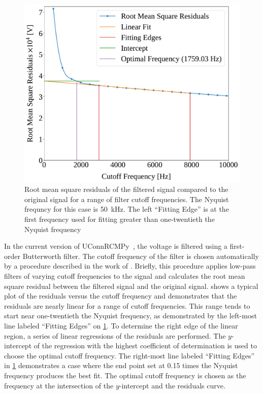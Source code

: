 \documentclass[12pt]{../ussci}
\begin{document}
\begin{figure}[htbp]
\begin{minipage}[t]{0.48\textwidth}
        \includegraphics[width=\linewidth]{figures/residuals.pdf}
        \caption{Root mean square residuals of the filtered signal compared to
        the original signal for a range of filter cutoff frequencies. The
        Nyquist frequncy for this case is \SI{50}{\kHz}. The left ``Fitting
        Edge'' is at the first frequency used for fitting greater than
        one-twentieth the Nyquist frequency}
        \label{fig:residuals}
    \end{minipage}
\end{figure}

In the current version of UConnRCMPy~\autocite{uconnrcmpy}, the voltage is
filtered using a first-order Butterworth filter. The cutoff frequency of the
filter is chosen automatically by a procedure described in the work of
\textcite{Yu1999,Duarte2014}. Briefly, this procedure applies low-pass filters
of varying cutoff frequencies to the signal and calculates the root mean square
residual between the filtered signal and the original signal.
 shows a typical plot of the residuals versus the cutoff
frequency and demonstrates that the residuals are nearly linear for a range of
cutoff frequencies. This range tends to start near one-twentieth the Nyquist
frequency, as demonstrated by the left-most line labeled ``Fitting Edges'' on
\cref{fig:residuals}. To determine the right edge of the linear region, a series
of linear regressions of the residuals are performed. The $y$-intercept of the
regression with the highest coefficient of determination is used to choose the
optimal cutoff frequency. The right-most line labeled ``Fitting Edges'' in
\cref{fig:residuals} demonstrates a case where the end point set at \num{0.15}
times the Nyquist frequency produces the best fit. The optimal cutoff frequency
is chosen as the frequency at the intersection of the $y$-intercept and the
residuals curve.
\end{document}

